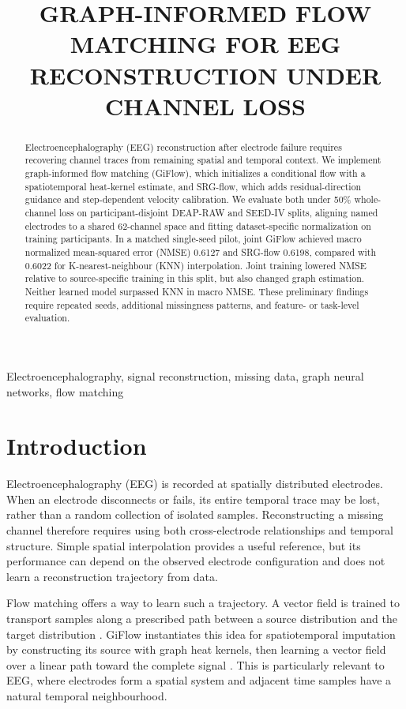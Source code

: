 \documentclass{article}
\title{GRAPH-INFORMED FLOW MATCHING FOR EEG RECONSTRUCTION UNDER CHANNEL LOSS}
\begin{document}
\maketitle

\begin{abstract}
Electroencephalography (EEG) reconstruction after electrode failure requires
recovering channel traces from remaining spatial and temporal context. We
implement graph-informed flow matching (GiFlow), which initializes a
conditional flow with a spatiotemporal heat-kernel estimate, and SRG-flow,
which adds residual-direction guidance and step-dependent velocity
calibration. We evaluate both under 50\% whole-channel loss on
participant-disjoint DEAP-RAW and SEED-IV splits, aligning named electrodes
to a shared 62-channel space and fitting dataset-specific normalization on
training participants. In a matched single-seed pilot, joint GiFlow achieved
macro normalized mean-squared error (NMSE) 0.6127 and SRG-flow 0.6198,
compared with 0.6022 for K-nearest-neighbour (KNN) interpolation. Joint
training lowered NMSE relative to source-specific training in this split,
but also changed graph estimation. Neither learned model surpassed KNN in
macro NMSE. These preliminary findings require repeated seeds, additional
missingness patterns, and feature- or task-level evaluation.
\end{abstract}

\begin{keywords}
Electroencephalography, signal reconstruction, missing data, graph neural
networks, flow matching
\end{keywords}

\section{Introduction}

Electroencephalography (EEG) is recorded at spatially distributed electrodes.
When an electrode disconnects or fails, its entire temporal trace may be
lost, rather than a random collection of isolated samples. Reconstructing a
missing channel therefore requires using both cross-electrode relationships
and temporal structure. Simple spatial interpolation provides a useful
reference, but its performance can depend on the observed electrode
configuration and does not learn a reconstruction trajectory from data.

Flow matching offers a way to learn such a trajectory. A vector field is
trained to transport samples along a prescribed path between a source
distribution and the target distribution \cite{lipman2023flow}. GiFlow
instantiates this idea for spatiotemporal imputation by constructing its
source with graph heat kernels, then learning a vector field over a linear
path toward the complete signal \cite{zhang2026giflow}. This is particularly
relevant to EEG, where electrodes form a spatial system and adjacent time
samples have a natural temporal neighbourhood.
\end{document}
